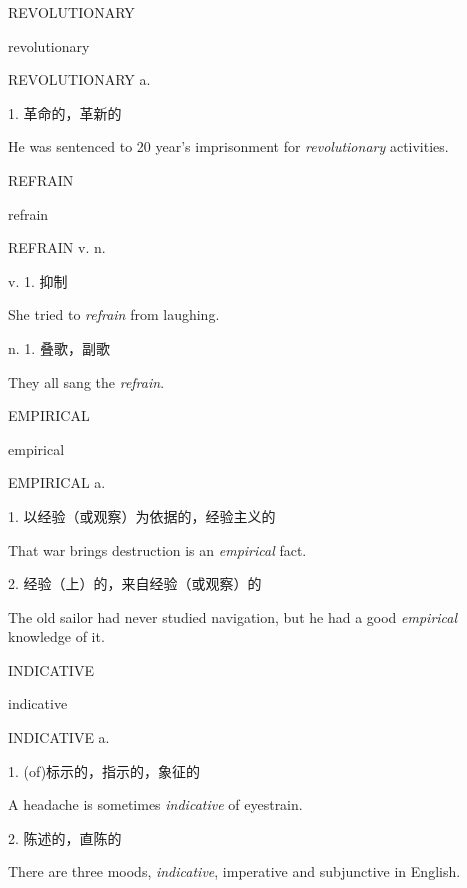 \begin{flashcard}{
REVOLUTIONARY

revolutionary
}
\begin{center}
REVOLUTIONARY a. 
\end{center}
1. 革命的，革新的

He was sentenced to 20 year's imprisonment for \textit{revolutionary} activities.

\end{flashcard}
\begin{flashcard}{
REFRAIN

refrain
}
\begin{center}
REFRAIN v. n. 
\end{center}
v. 1. 抑制

She tried to \textit{refrain} from laughing.

n. 1. 叠歌，副歌

They all sang the \textit{refrain}.

\end{flashcard}
\begin{flashcard}{
EMPIRICAL

empirical
}
\begin{center}
EMPIRICAL a. 
\end{center}
1. 以经验（或观察）为依据的，经验主义的

That war brings destruction is an \textit{empirical} fact.

2. 经验（上）的，来自经验（或观察）的

The old sailor had never studied navigation, but he had a good \textit{empirical} knowledge of it.

\end{flashcard}
\begin{flashcard}{
INDICATIVE

indicative
}
\begin{center}
INDICATIVE a. 
\end{center}
1. (of)标示的，指示的，象征的

A headache is sometimes \textit{indicative} of eyestrain.

2. 陈述的，直陈的

There are three moods, \textit{indicative}, imperative and subjunctive in English.

\end{flashcard}
